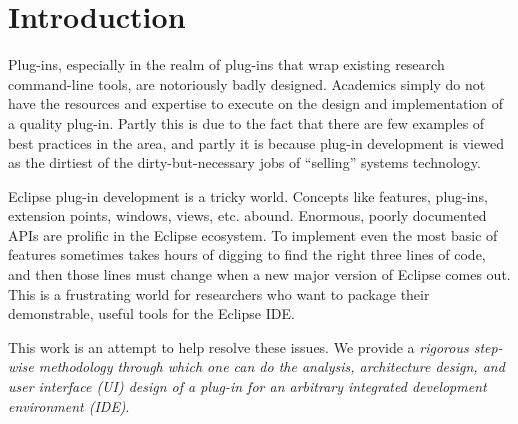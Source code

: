 \documentclass[conference]{IEEEtran}
\newcommand{\etc}{etc.\xspace}
\begin{document}

%
\IEEEpeerreviewmaketitle


\section{Introduction}
\label{sec:introduction}

Plug-ins, especially in the realm of plug-ins that wrap existing
research command-line tools, are notoriously badly designed.
Academics simply do not have the resources and expertise to execute on
the design and implementation of a quality plug-in.  Partly this is due
to the fact that there are few examples of best practices in the area,
and partly it is because plug-in development is viewed as the dirtiest
of the dirty-but-necessary jobs of ``selling'' systems technology.


Eclipse plug-in development is a tricky world.  Concepts like
features, plug-ins, extension points, windows, views, \etc abound.
Enormous, poorly documented APIs are prolific in the Eclipse
ecosystem.  To implement even the most basic of features sometimes
takes hours of digging to find the right three lines of code, and then
those lines must change when a new major version of Eclipse comes out.
This is a frustrating world for researchers who want to package their
demonstrable, useful tools for the Eclipse IDE.

This work is an attempt to help resolve these issues.  
We
provide a \emph{rigorous step-wise methodology through which one can
  do the analysis, architecture design, and user interface (UI) design
  of a plug-in for an arbitrary integrated development environment
  (IDE)}.  
\end{document}
